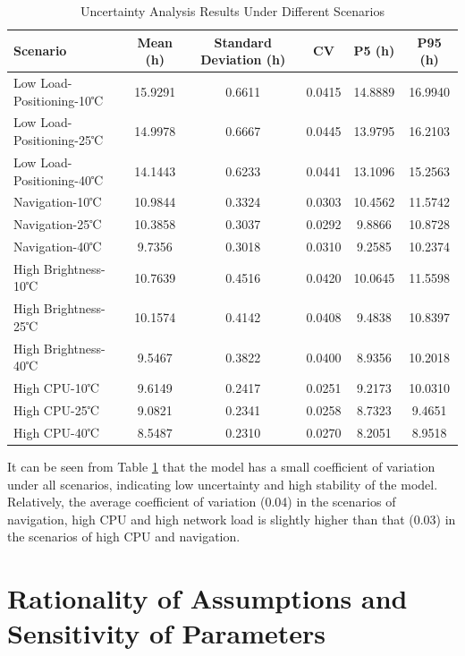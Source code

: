 \documentclass{mcmthesis}  %
\begin{document}
	\begin{table}[h!]
		\centering
		\renewcommand{\arraystretch}{1.5}
		\caption{Uncertainty Analysis Results Under Different Scenarios}
		\label{tab:控制变量}
		\begin{tabular}{lccccc}
			\toprule
			Scenario & Mean (h) & Standard Deviation (h) & CV & P5 (h) & P95 (h) \\
			\midrule
			\rowcolor{LightBlue}
			Low Load-Positioning-10℃ & 15.9291 & 0.6611 & 0.0415 & 14.8889 & 16.9940 \\
			Low Load-Positioning-25℃ & 14.9978 & 0.6667 & 0.0445 & 13.9795 & 16.2103 \\
			\rowcolor{LightBlue}
			Low Load-Positioning-40℃ & 14.1443 & 0.6233 & 0.0441 & 13.1096 & 15.2563 \\
			Navigation-10℃ & 10.9844 & 0.3324 & 0.0303 & 10.4562 & 11.5742 \\
			\rowcolor{LightBlue}
			Navigation-25℃ & 10.3858 & 0.3037 & 0.0292 & 9.8866 & 10.8728 \\
			Navigation-40℃ & 9.7356 & 0.3018 & 0.0310 & 9.2585 & 10.2374 \\
			\rowcolor{LightBlue}
			High Brightness-10℃ & 10.7639 & 0.4516 & 0.0420 & 10.0645 & 11.5598 \\
			High Brightness-25℃ & 10.1574 & 0.4142 & 0.0408 & 9.4838 & 10.8397 \\
			\rowcolor{LightBlue}
			High Brightness-40℃ & 9.5467 & 0.3822 & 0.0400 & 8.9356 & 10.2018 \\
			High CPU-10℃ & 9.6149 & 0.2417 & 0.0251 & 9.2173 & 10.0310 \\
			\rowcolor{LightBlue}
			High CPU-25℃ & 9.0821 & 0.2341 & 0.0258 & 8.7323 & 9.4651 \\
			High CPU-40℃ & 8.5487 & 0.2310 & 0.0270 & 8.2051 & 8.9518 \\
			\bottomrule
		\end{tabular}
	\end{table}
	
	It can be seen from Table \ref{tab:控制变量} that the model has a small coefficient of variation under all scenarios, indicating low uncertainty and high stability of the model. Relatively, the average coefficient of variation (0.04) in the scenarios of navigation, high CPU and high network load is slightly higher than that (0.03) in the scenarios of high CPU and navigation.
	
	
	\section{Rationality of Assumptions and Sensitivity of Parameters}
	
\end{document}
